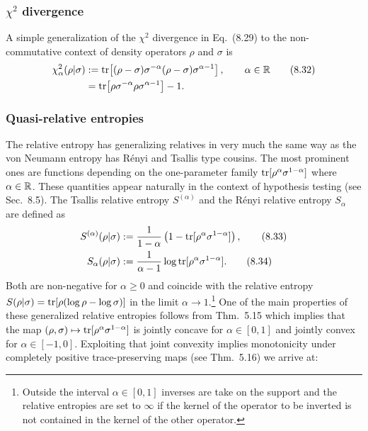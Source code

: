 \documentclass[11pt,a4paper]{article}
\theoremstyle{plain}
\theoremstyle{definition}
\theoremstyle{remark}
\begin{document}
\subsubsection{$\chi^2$ divergence}

A simple generalization of the $\chi^2$ divergence in Eq.~(8.29) to the non-commutative context of density operators $\rho$ and $\sigma$ is
\begin{align}
    \chi^2_\alpha(\rho|\sigma)
     &:= \operatorname{tr}\!\left[(\rho-\sigma)\sigma^{-\alpha}(\rho-\sigma)\sigma^{\alpha-1}\right],
    \qquad \alpha\in\mathbb{R} \tag{8.32}\\
     &= \operatorname{tr}\!\left[\rho\sigma^{-\alpha}\rho\sigma^{\alpha-1}\right] - 1. \notag
\end{align}

\subsubsection{Quasi-relative entropies}

The relative entropy has generalizing relatives in very much the same way as the
von Neumann entropy has R\'enyi and Tsallis type cousins. The most prominent
ones are functions depending on the one-parameter family $\operatorname{tr}[\rho^\alpha\sigma^{1-\alpha}]$ where
$\alpha\in\mathbb{R}$. These quantities appear naturally in the context of hypothesis testing
(see Sec.~8.5). The Tsallis relative entropy $S^{(\alpha)}$ and the R\'enyi relative entropy
$S_\alpha$ are defined as
\begin{align}
    S^{(\alpha)}(\rho|\sigma)
     &:= \frac{1}{1-\alpha}\left(1-\operatorname{tr}[\rho^\alpha\sigma^{1-\alpha}]\right), \tag{8.33}\\
    S_\alpha(\rho|\sigma)
     &:= \frac{1}{\alpha-1}\log \operatorname{tr}[\rho^\alpha\sigma^{1-\alpha}]. \tag{8.34}
\end{align}
Both are non-negative for $\alpha\ge 0$ and coincide with the relative entropy
$S(\rho|\sigma)=\operatorname{tr}[\rho(\log\rho-\log\sigma)]$ in the limit $\alpha\to 1$.\footnote{Outside the interval $\alpha\in[0,1]$ inverses are take on the support and the relative entropies
    are set to $\infty$ if the kernel of the operator to be inverted is not contained in the kernel of the
    other operator.}
One of the main properties of these generalized relative entropies follows from Thm.~5.15 which implies that the map
$(\rho,\sigma)\mapsto \operatorname{tr}[\rho^\alpha\sigma^{1-\alpha}]$ is jointly concave for $\alpha\in[0,1]$ and jointly convex for $\alpha\in[-1,0]$.
Exploiting that joint convexity implies monotonicity under completely positive trace-preserving maps (see Thm.~5.16) we arrive at:
\end{document}
